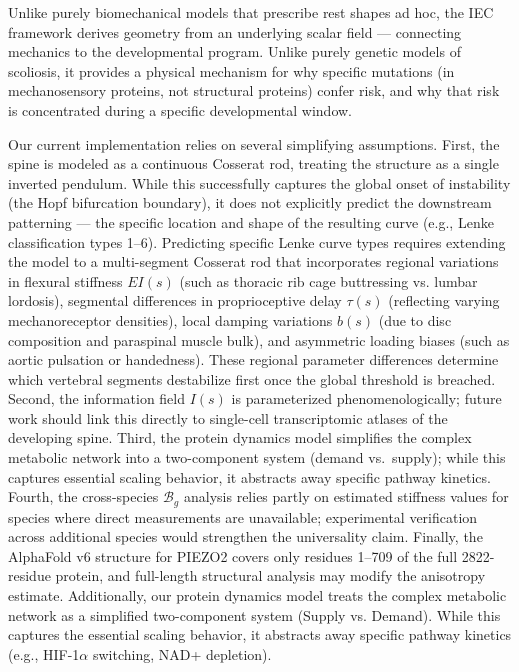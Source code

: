 \documentclass[11pt]{article}
\begin{document}
Unlike purely biomechanical models that prescribe rest shapes ad hoc, the IEC framework derives geometry from an underlying scalar field --- connecting mechanics to the developmental program. Unlike purely genetic models of scoliosis, it provides a physical mechanism for why specific mutations (in mechanosensory proteins, not structural proteins) confer risk, and why that risk is concentrated during a specific developmental window.



Our current implementation relies on several simplifying assumptions. First, the spine is modeled as a continuous Cosserat rod, treating the structure as a single inverted pendulum. While this successfully captures the global onset of instability (the Hopf bifurcation boundary), it does not explicitly predict the downstream patterning --- the specific location and shape of the resulting curve (e.g., Lenke classification types 1--6). Predicting specific Lenke curve types requires extending the model to a multi-segment Cosserat rod that incorporates regional variations in flexural stiffness $EI(s)$ (such as thoracic rib cage buttressing vs. lumbar lordosis), segmental differences in proprioceptive delay $\tau(s)$ (reflecting varying mechanoreceptor densities), local damping variations $b(s)$ (due to disc composition and paraspinal muscle bulk), and asymmetric loading biases (such as aortic pulsation or handedness). These regional parameter differences determine which vertebral segments destabilize first once the global threshold is breached. Second, the information field $I(s)$ is parameterized phenomenologically; future work should link this directly to single-cell transcriptomic atlases of the developing spine. Third, the protein dynamics model simplifies the complex metabolic network into a two-component system (demand vs.\ supply); while this captures essential scaling behavior, it abstracts away specific pathway kinetics. Fourth, the cross-species $\mathcal{B}_g$ analysis relies partly on estimated stiffness values for species where direct measurements are unavailable; experimental verification across additional species would strengthen the universality claim. Finally, the AlphaFold v6 structure for PIEZO2 covers only residues 1--709 of the full 2822-residue protein, and full-length structural analysis may modify the anisotropy estimate.
Additionally, our protein dynamics model treats the complex metabolic network as a simplified two-component system (Supply vs. Demand). While this captures the essential scaling behavior, it abstracts away specific pathway kinetics (e.g., HIF-1$\alpha$ switching, NAD+ depletion).
\end{document}
